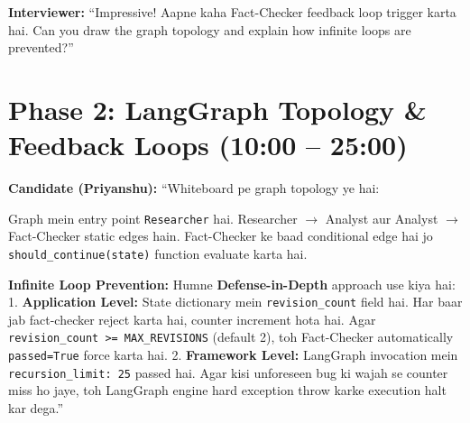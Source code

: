 \documentclass[11pt,a4paper,twoside]{report}
\begin{document}
\textbf{Interviewer:} ``Impressive! Aapne kaha Fact-Checker feedback loop trigger karta hai. Can you draw the graph topology and explain how infinite loops are prevented?''

\section{Phase 2: LangGraph Topology \& Feedback Loops (10:00 -- 25:00)}

\textbf{Candidate (Priyanshu):} ``Whiteboard pe graph topology ye hai:

\begin{center}
\end{center}

Graph mein entry point \texttt{Researcher} hai.
Researcher $\rightarrow$ Analyst aur Analyst $\rightarrow$ Fact-Checker static edges hain.
Fact-Checker ke baad conditional edge hai jo \texttt{should\_continue(state)} function evaluate karta hai.

\textbf{Infinite Loop Prevention:}
Humne \textbf{Defense-in-Depth} approach use kiya hai:
1. \textbf{Application Level:} State dictionary mein \texttt{revision\_count} field hai. Har baar jab fact-checker reject karta hai, counter increment hota hai. Agar \texttt{revision\_count >= MAX\_REVISIONS} (default 2), toh Fact-Checker automatically \texttt{passed=True} force karta hai.
2. \textbf{Framework Level:} LangGraph invocation mein \texttt{recursion\_limit: 25} passed hai. Agar kisi unforeseen bug ki wajah se counter miss ho jaye, toh LangGraph engine hard exception throw karke execution halt kar dega.''
\end{document}
